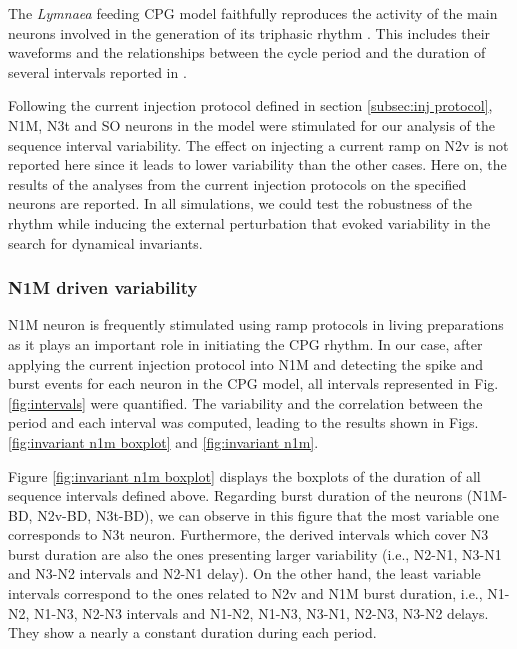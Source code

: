 
The \textit{Lymnaea} feeding CPG model faithfully reproduces the activity of the main neurons involved in the generation of its triphasic rhythm \cite{Vavoulis2007}. This includes their waveforms and the relationships between the cycle period and the duration of several intervals reported in \cite{Elliott1991}.




Following the current injection protocol defined in section \ref{subsec:inj protocol}, N1M, N3t and SO neurons in the model were stimulated for our analysis of the sequence interval variability. 
The effect on injecting a current ramp on N2v is not reported here since it leads to lower variability than the other cases. Here on, the results of the analyses from the  current injection protocols on the specified neurons are reported. In all simulations, we could test the robustness of the rhythm while inducing the external perturbation that evoked variability in the search for dynamical invariants.


\subsubsection{N1M driven variability}
\label{subsec:n1m driven}

N1M neuron is frequently stimulated using ramp protocols in living preparations \cite{Elliott1991} as it plays an important role in initiating the CPG rhythm. In our case, after applying the current injection protocol into N1M and detecting the spike and burst events for each neuron in the CPG model, all  intervals represented in Fig. \ref{fig:intervals} were quantified. The variability and the correlation between the period and each interval was computed, leading to the results shown in Figs. \ref{fig:invariant n1m boxplot} and \ref{fig:invariant n1m}.

Figure \ref{fig:invariant n1m boxplot} displays the boxplots of the duration of all sequence intervals defined above. Regarding burst duration of the neurons (N1M-BD, N2v-BD, N3t-BD), we can observe in this figure that the most variable one corresponds to N3t neuron. Furthermore, the derived intervals which cover N3 burst duration are also the ones presenting larger variability (i.e., N2-N1, N3-N1 and N3-N2 intervals and N2-N1 delay). On the other hand, the least variable intervals correspond to the ones related to N2v and N1M burst duration, i.e., N1-N2, N1-N3, N2-N3 intervals and N1-N2, N1-N3, N3-N1, N2-N3, N3-N2 delays. They show a nearly a constant duration during each period.

